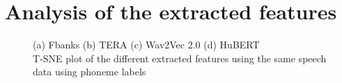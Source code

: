 \section{Analysis of the extracted features}
\begin{figure}
  \begin{center}
  \centering
  \caption{(a) Fbanks (b) TERA (c) Wav2Vec 2.0 (d) HuBERT \\ T-SNE plot of the different extracted features using the same speech data using phoneme labels}
  \label{fig:tsne_ssl}  
\end{center}
\end{figure}

